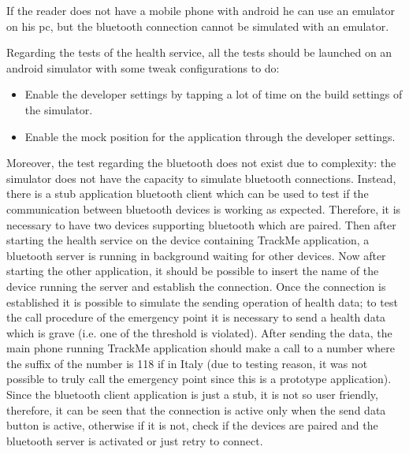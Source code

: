 \par
If the reader does not have a mobile phone with android he can use an emulator on his pc, but the bluetooth connection cannot be simulated with an emulator.

Regarding the tests of the health service, all the tests should be launched on an android simulator with some tweak configurations to do:
\begin{itemize}
\item Enable the developer settings by tapping a lot of time on the build settings of the simulator.
\item Enable the mock position for the application through the developer settings.
\end{itemize}
Moreover, the test regarding the bluetooth does not exist due to complexity: the simulator does not have the capacity to 
simulate bluetooth connections. Instead, there is a stub application bluetooth client which can be used to test if the 
communication between bluetooth devices is working as expected. Therefore, it is necessary to have two devices 
supporting bluetooth which are paired. Then after starting the health service on the device containing TrackMe application, 
a bluetooth server is running in background waiting for other devices. Now after starting the other application, it should be possible 
to insert the name of the device running the server and establish the connection. Once the connection is established it is possible 
to simulate the sending operation of health data; to test the call procedure of the emergency point it is necessary to send a health 
data which is grave (i.e. one of the threshold is violated). After sending the data, the main phone running TrackMe application 
should make a call to a number where the suffix of the number is 118 if in Italy (due to testing reason, it was not possible to truly 
call the emergency point since this is a prototype application).
Since the bluetooth client application is just a stub, it is not so user friendly, therefore, it can be seen that the connection is active 
only when the send data button is active, otherwise if it is not, check if the devices are paired and the bluetooth server is activated or 
just retry to connect.


